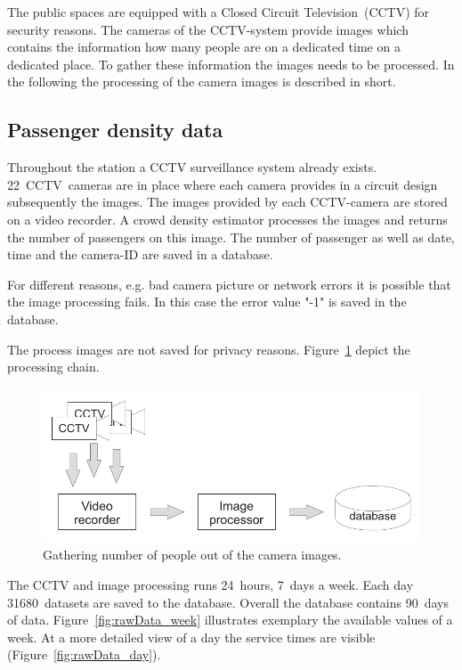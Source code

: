 The public spaces are equipped with a Closed Circuit Television~(CCTV) for security reasons. The cameras of the CCTV-system provide images which contains the information how many people are on a dedicated time on a dedicated place. To gather these information the images needs to be processed. In the following the processing of the camera images is described in short.


\subsection{Passenger density data}
\label{subsec:PassengerDensityData}

Throughout the station a CCTV surveillance system already exists. 22~CCTV~cameras are in place where each camera provides in a circuit design subsequently the images. The images provided by each CCTV-camera are stored on a video recorder. A crowd density estimator processes the images and returns the number of passengers on this image. The number of passenger as well as date, time and the camera-ID are saved in a database.

For different reasons, e.g. bad camera picture or network errors it is possible that the image processing fails. In this case the error value "-1" is saved in the database.

The process images are not saved for privacy reasons. Figure~\ref{fig:CCTVimageProcessing} depict the processing chain.

\begin{figure}[htb]
  \centering
  \includegraphics[width=\linewidth]{imageProcessing.pdf} 
  \caption{Gathering number of people out of the camera images.}
  \label{fig:CCTVimageProcessing}
\end{figure}

The CCTV and image processing runs 24~hours, 7~days a week. Each day 31680~datasets are saved to the database. Overall the database contains 90~days of data.
Figure~\ref{fig:rawData_week} illustrates exemplary the available values of a week. At a more detailed view of a day the service times are visible (Figure~\ref{fig:rawData_day}).

